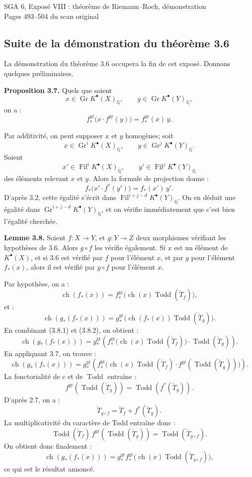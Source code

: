 \documentclass[11pt]{article}
\newcommand{\Gr}{\operatorname{Gr}}
\newcommand{\Fil}{\operatorname{Fil}}
\newcommand{\ch}{\operatorname{ch}}
\newcommand{\Todd}{\operatorname{Todd}}
\providecommand{\ch}{\operatorname{ch}}
\providecommand{\Todd}{\operatorname{Todd}}
\providecommand{\Gr}{\operatorname{Gr}}
\providecommand{\Gr}{\operatorname{G}}
\begin{document}
\begin{center}
{\Large SGA 6, Exposé VIII : théorème de Riemann--Roch, démonstration}\\[0.4em]
{\large Pages 493--504 du scan original}
\end{center}


\subsection*{Suite de la démonstration du théorème 3.6}

La démonstration du théorème 3.6 occupera la fin de cet exposé. Donnons quelques préliminaires.

\textbf{Proposition 3.7.} Quels que soient
\[
x\in \Gr K^{\bullet}(X)_{\mathbb Q},\qquad
y\in \Gr K^{\bullet}(Y)_{\mathbb Q},
\]
on a :
\[
 f^{\mathrm{gr}}_*\bigl(x\cdot f^{\mathrm{gr}}(y)\bigr)
 =
 f^{\mathrm{gr}}_*(x)\,y .
\]

Par additivité, on peut supposer \(x\) et \(y\) homogènes; soit
\[
x\in \Gr^iK^{\bullet}(X)_{\mathbb Q},\qquad
y\in \Gr^jK^{\bullet}(Y)_{\mathbb Q}.
\]
Soient
\[
x'\in \Fil^iK^{\bullet}(X)_{\mathbb Q},\qquad
y'\in \Fil^jK^{\bullet}(Y)_{\mathbb Q}
\]
des éléments relevant \(x\) et \(y\). Alors la formule de projection donne :
\[
 f_*\bigl(x'\cdot f^*(y')\bigr)=f_*(x')\,y'.
\]
D'après 3.2, cette égalité s'écrit dans
\(\Fil^{i+j-d}K^{\bullet}(Y)_{\mathbb Q}\). On en déduit une égalité dans
\(\Gr^{i+j-d}K^{\bullet}(Y)_{\mathbb Q}\), et on vérifie immédiatement que c'est bien l'égalité cherchée.

\textbf{Lemme 3.8.} Soient \(f:X\to Y\), et \(g:Y\to Z\) deux morphismes vérifiant les hypothèses de 3.6. Alors \(g\circ f\) les vérifie également. Si \(x\) est un élément de \(K^{\bullet}(X)\), et si 3.6 est vérifié par \(f\) pour l'élément \(x\), et par \(g\) pour l'élément \(f_*(x)\), alors il est vérifié par \(g\circ f\) pour l'élément \(x\).

Par hypothèse, on a :
\begin{equation}\tag{3.8.1}
 \ch(f_*(x))=
 f^{\mathrm{gr}}_*\bigl(\ch(x)\Todd(\check T_f)\bigr),
\end{equation}
et :
\begin{equation}\tag{3.8.2}
 \ch(g_*(f_*(x)))=
 g^{\mathrm{gr}}_*\bigl(\ch(f_*(x))\Todd(\check T_g)\bigr).
\end{equation}
En combinant (3.8.1) et (3.8.2), on obtient :
\[
\ch(g_*(f_*(x)))=
g^{\mathrm{gr}}_*\!\left(
 f^{\mathrm{gr}}_*\bigl(\ch(x)\Todd(\check T_f)\bigr)\cdot \Todd(\check T_g)
\right).
\]
En appliquant 3.7, on trouve :
\[
\ch(g_*(f_*(x)))=
g^{\mathrm{gr}}_*\!\left(
 f^{\mathrm{gr}}_*\bigl(\ch(x)\Todd(\check T_f)\cdot
 f^{\mathrm{gr}}(\Todd(\check T_g))\bigr)
\right).
\]
La fonctorialité de \(c\) et de \(\Todd\) entraîne :
\[
 f^{\mathrm{gr}}(\Todd(\check T_g))=\Todd(f^*(\check T_g)).
\]
D'après 2.7, on a :
\[
 \check T_{g\circ f}=\check T_f+f^*(\check T_g).
\]
La multiplicativité du caractère de Todd entraîne donc :
\[
 \Todd(\check T_f)\,f^{\mathrm{gr}}(\Todd(\check T_g))
 =
 \Todd(\check T_{g\circ f}).
\]
On obtient donc finalement :
\[
 \ch(g_*(f_*(x)))=
 g^{\mathrm{gr}}_* f^{\mathrm{gr}}_*\bigl(\ch(x)\Todd(\check T_{g\circ f})\bigr),
\]
ce qui est le résultat annoncé.
\end{document}
